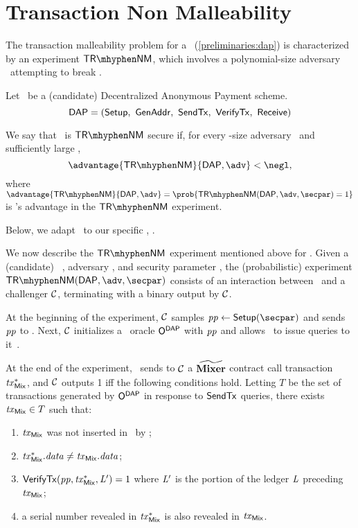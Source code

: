 \chapter{Transaction Non Malleability}\label{appendix:trnm}

The transaction malleability problem for a \dapscheme~(\cref{preliminaries:dap}) is characterized by an experiment $\trnm$, which involves a polynomial-size adversary \adv~attempting to break \dapscheme.

\begin{definition}
Let \dapscheme~be a (candidate) Decentralized Anonymous Payment scheme.
\[
  \dapscheme = (\setup,\ \genadd,\ \sendtx,\ \verifytx,\ \receive)
\]

We say that \dapscheme~is $\trnm$ secure if, for every \poly-size adversary \adv~and sufficiently large \secpar,
\[
    \advantage{\trnm}{\dapscheme, \adv} < \negl,
\]
where $\advantage{\trnm}{\dapscheme ,\adv} = \prob{\trnm(\dapscheme, \adv, \secpar) = 1}$ is \adv’s advantage in the $\trnm$ experiment.
\end{definition}

Below, we adapt~\cite[Appendix C.2]{sasson2014zerocash} to our specific \dapscheme, \zeth.

We now describe the $\trnm$ experiment mentioned above for \zeth. Given a (candidate) \zeth~\dapscheme, adversary \adv, and security parameter \secpar, the (probabilistic) experiment $\trnm(\dapscheme, \adv, \secpar)$ consists of an interaction between \adv~and a challenger $\mathcal{C}$, terminating with a binary output by $\mathcal{C}$.

At the beginning of the experiment, $\mathcal{C}$ samples $\pparams \gets \setup(\secpar)$ and sends $\mathit{pp}$ to \adv. Next, $\mathcal{C}$ initializes a \dapscheme~oracle $\mathsf{O}^{\mathsf{DAP}}$ with $\mathit{pp}$ and allows \adv~to issue queries to it~\cite[Appendix B]{zethpaper}.

At the end of the experiment, \adv~sends to $\mathcal{C}$ a $\widetilde{\mathbf{Mixer}}$ contract call transaction $\mathit{tx}^*_{\mathsf{Mix}}$, and $\mathcal{C}$ outputs 1 iff the following conditions hold. Letting $T$ be the set of transactions generated by $\mathsf{O}^{\mathsf{DAP}}$ in response to $\mathsf{SendTx}$ queries, there exists $\mathit{tx}_{\mathsf{Mix}} \in T$ such that:
\begin{enumerate}
    \item $\mathit{tx}_{\mathsf{Mix}}$ was not inserted in \ledger~by \adv;
    \item $\mathit{tx}^*_{\mathsf{Mix}}.\mathit{data} \neq \mathit{tx}_{\mathsf{Mix}}.\mathit{data}$;
    \item $\mathsf{VerifyTx}(\mathit{pp}, \mathit{tx}^*_{\mathsf{Mix}}, \mathit{L}') = 1$ where $\mathit{L}'$ is the portion of the ledger $\mathit{L}$ preceding $\mathit{tx}_{\mathsf{Mix}}$;
    \item a serial number revealed in $\mathit{tx}^*_{\mathsf{Mix}}$ is also revealed in $\mathit{tx}_{\mathsf{Mix}}$.
\end{enumerate}

